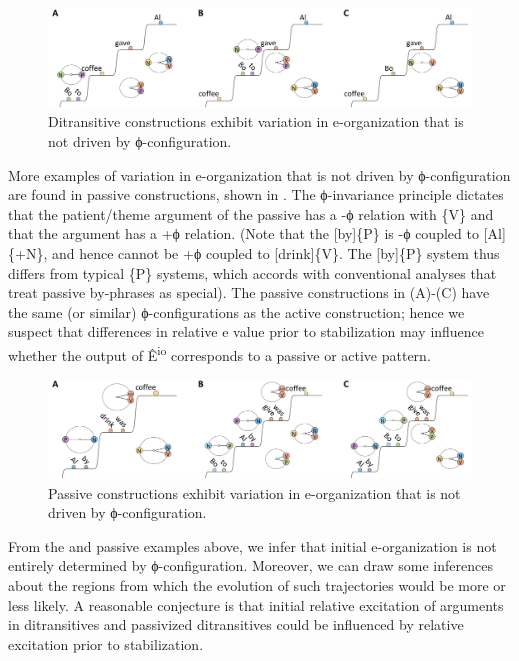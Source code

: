  
\begin{figure}
\includegraphics[width=\textwidth]{figures/Tilsen-img80.png}
\caption{Ditransitive constructions exhibit variation in e-organization that is not driven by ϕ-configuration.}
\label{fig:4:30}
\end{figure}
 

  More examples of variation in e-organization that is not driven by ϕ-configuration are found in passive constructions, shown in {}. The ϕ-invariance principle dictates that the patient/theme argument of the passive has a -ϕ relation with \{V\} and that the  argument has a +ϕ relation. (Note that the  [by]\{P\} is -ϕ coupled to [Al]\{+N\}, and hence cannot be +ϕ coupled to [drink]\{V\}. The [by]\{P\} system thus differs from typical \{P\} systems, which accords with conventional analyses that treat passive by-phrases as special). The passive constructions in {}(A)-(C) have the same (or similar) ϕ-configurations as the active construction; hence we suspect that differences in relative e value prior to stabilization may influence whether the output of Ê\textsuperscript{io} corresponds to a passive or active pattern.

  
\begin{figure}
\includegraphics[width=\textwidth]{figures/Tilsen-img81.png}
\caption{Passive constructions exhibit variation in e-organization that is not driven by ϕ-configuration.}
\label{fig:4:31}
\end{figure}
 

  From the  and passive examples above, we infer that initial e-organization is not entirely determined by ϕ-configuration. Moreover, we can draw some inferences about the  regions from which the evolution of such trajectories would be more or less likely. A reasonable conjecture is that initial relative excitation of arguments in ditransitives and passivized ditransitives could be influenced by relative excitation prior to stabilization.

